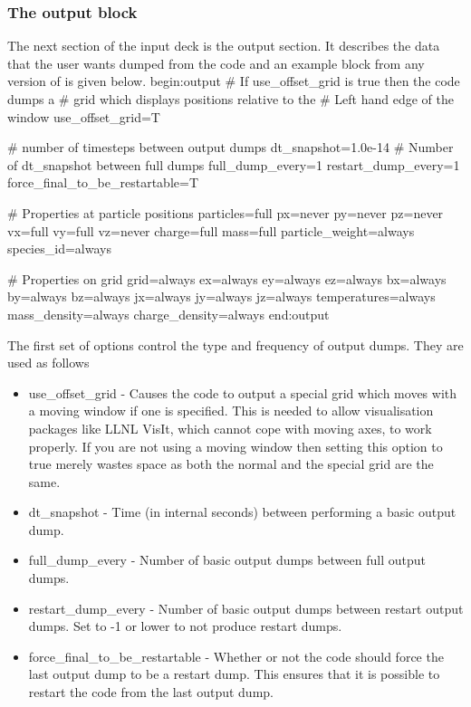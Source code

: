 \documentclass[12pt,a4paper]{article}
\newcommand{\EPOCH}{{\color{warwickdark}\fontfamily{phv}\selectfont{EPOCH}}}
\newenvironment{boxverbatim}{\lboxverbatim{none}}{\endlboxverbatim}
\begin{document}
\subsubsection{The output block}
The next section of the input deck is the output section. It describes the
data that the user wants dumped from the code and an example block from any
version of {\EPOCH} is given below.
\begin{boxverbatim}
begin:output
   # If use_offset_grid is true then the code dumps a
   # grid which displays positions relative to the
   # Left hand edge of the window
   use_offset_grid=T

   # number of timesteps between output dumps
   dt_snapshot=1.0e-14
   # Number of dt_snapshot between full dumps
   full_dump_every=1
   restart_dump_every=1
   force_final_to_be_restartable=T

   # Properties at particle positions
   particles=full
   px=never
   py=never
   pz=never
   vx=full
   vy=full
   vz=never
   charge=full
   mass=full
   particle_weight=always
   species_id=always

   # Properties on grid
   grid=always
   ex=always
   ey=always
   ez=always
   bx=always
   by=always
   bz=always
   jx=always
   jy=always
   jz=always
   temperatures=always
   mass_density=always
   charge_density=always
end:output
\end{boxverbatim}

The first set of options control the type and frequency of output dumps. They
are used as follows\\
\begin{itemize}
\item use\_offset\_grid - Causes the code to output a special grid which moves
  with a moving window if one is specified. This is needed to allow
  visualisation packages like LLNL VisIt, which cannot cope with moving axes, to
  work properly. If you are not using a moving window then setting this option
  to true merely wastes space as both the normal and the special grid are the
  same.
\item dt\_snapshot - Time (in internal seconds) between performing a basic
  output dump.
\item full\_dump\_every - Number of basic output dumps between full output
  dumps.
\item restart\_dump\_every - Number of basic output dumps between restart
  output dumps. Set to -1 or lower to not produce restart dumps.
\item force\_final\_to\_be\_restartable - Whether or not the code should force
  the last output dump to be a restart dump. This ensures that it is possible
  to restart the code from the last output dump.
\end{itemize}
\end{document}

